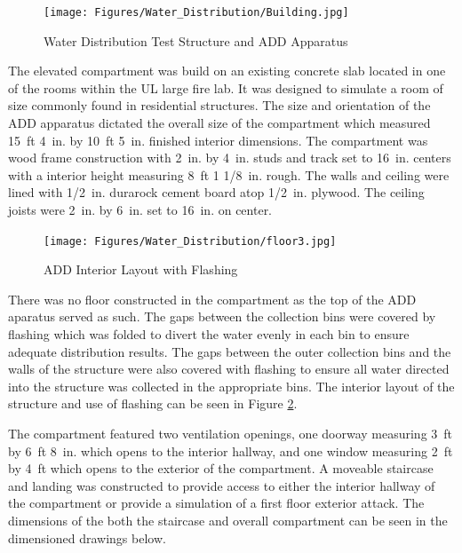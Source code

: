 \documentclass{article}
\begin{document}
\begin{figure}[!ht]
	\centering
	\texttt{[image: Figures/Water\_Distribution/Building.jpg]}
	\caption{Water Distribution Test Structure and ADD Apparatus}
	\label{fig:Water_Distribution_Test_Structure_and_ADD_Apparatus}
\end{figure}

The elevated compartment was build on an existing concrete slab located in one of the rooms within the UL large fire lab. It was designed to simulate a room of size commonly found in residential structures. The size and orientation of the ADD apparatus dictated the overall size of the compartment which measured 15~ft 4~in. by 10~ft 5~in. finished interior dimensions. The compartment was wood frame construction with 2~in. by 4~in. studs and track set to 16~in. centers with a interior height measuring 8~ft 1 1/8~in. rough. The walls and ceiling were lined with 1/2~in. durarock cement board atop 1/2~in. plywood. The ceiling joists were 2~in. by 6~in. set to 16~in. on center. 

\begin{figure}[!ht]
	\centering
	\texttt{[image: Figures/Water\_Distribution/floor3.jpg]}
	\caption{ADD Interior Layout with Flashing}
	\label{fig:ADD_Flashing}
\end{figure}

\clearpage

There was no floor constructed in the compartment as the top of the ADD aparatus served as such. The gaps between the collection bins were covered by flashing which was folded to divert the water evenly in each bin to ensure adequate distribution results. The gaps between the outer collection bins and the walls of the structure were also covered with flashing to ensure all water directed into the structure was collected in the appropriate bins. The interior layout of the structure and use of flashing can be seen in Figure \ref{fig:ADD_Flashing}. 

The compartment featured two ventilation openings, one doorway measuring 3~ft by 6~ft 8~in. which opens to the interior hallway, and one window measuring 2~ft by 4~ft which opens to the exterior of the compartment. A moveable staircase and landing was constructed to provide access to either the interior hallway of the compartment or provide a simulation of a first floor exterior attack. The dimensions of the both the staircase and overall compartment can be seen in the dimensioned drawings below.
\end{document}
